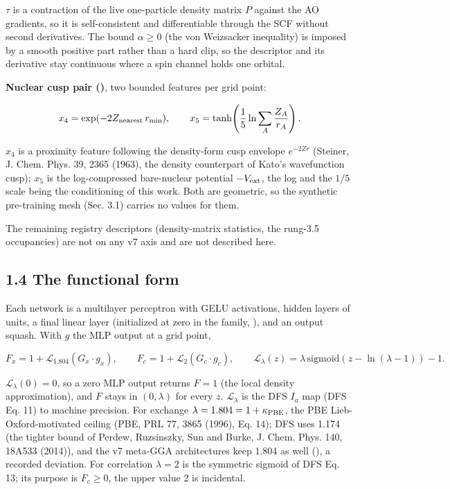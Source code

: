 \documentclass[10pt,a4paper]{article}
\begin{document}
$\tau$ is a contraction of the live one-particle density matrix $P$ against the AO gradients, so it is self-consistent and differentiable through the SCF without second derivatives. The bound $\alpha \ge 0$ (the von Weizsacker inequality) is imposed by a smooth positive part rather than a hard clip, so the descriptor and its derivative stay continuous where a spin channel holds one orbital.

\textbf{Nuclear cusp pair ()}, two bounded features per grid point:

\[
x_4 = \exp(-2 Z_{\rm nearest}\, r_{\min}), \qquad
x_5 = \tanh\!\left(\frac{1}{5}\ln \sum_A \frac{Z_A}{r_A}\right).
\]

$x_4$ is a proximity feature following the density-form cusp envelope $e^{-2Zr}$ (Steiner, J. Chem. Phys. 39, 2365 (1963), the density counterpart of Kato's wavefunction cusp); $x_5$ is the log-compressed bare-nuclear potential $-V_{\rm ext}$, the log and the $1/5$ scale being the conditioning of this work. Both are geometric, so the synthetic pre-training mesh (Sec. 3.1) carries no values for them.

The remaining registry descriptors (density-matrix statistics, the rung-3.5 occupancies) are not on any v7 axis and are not described here.

\subsection*{1.4 The functional form}

Each network is a multilayer perceptron with GELU activations,  hidden layers of  units, a final linear layer (initialized at zero in the  family, ), and an output squash. With $g$ the MLP output at a grid point,

\[
F_x = 1 + \mathcal{L}_{1.804}\!\left(G_x \cdot g_x\right), \qquad
F_c = 1 + \mathcal{L}_{2}\!\left(G_c \cdot g_c\right), \qquad
\mathcal{L}_{\lambda}(z) = \lambda\,\mathrm{sigmoid}\!\left(z - \ln(\lambda - 1)\right) - 1.
\]

$\mathcal{L}_\lambda(0) = 0$, so a zero MLP output returns $F = 1$ (the local density approximation), and $F$ stays in $(0, \lambda)$ for every $z$. $\mathcal{L}_\lambda$ is the DFS $I_a$ map (DFS Eq. 11) to machine precision. For exchange $\lambda = 1.804 = 1 + \kappa_{\rm PBE}$, the PBE Lieb-Oxford-motivated ceiling (PBE, PRL 77, 3865 (1996), Eq. 14); DFS uses 1.174 (the tighter bound of Perdew, Ruzsinszky, Sun and Burke, J. Chem. Phys. 140, 18A533 (2014)), and the v7 meta-GGA architectures keep 1.804 as well (), a recorded deviation. For correlation $\lambda = 2$ is the symmetric sigmoid of DFS Eq. 13; its purpose is $F_c \ge 0$, the upper value 2 is incidental.
\end{document}
